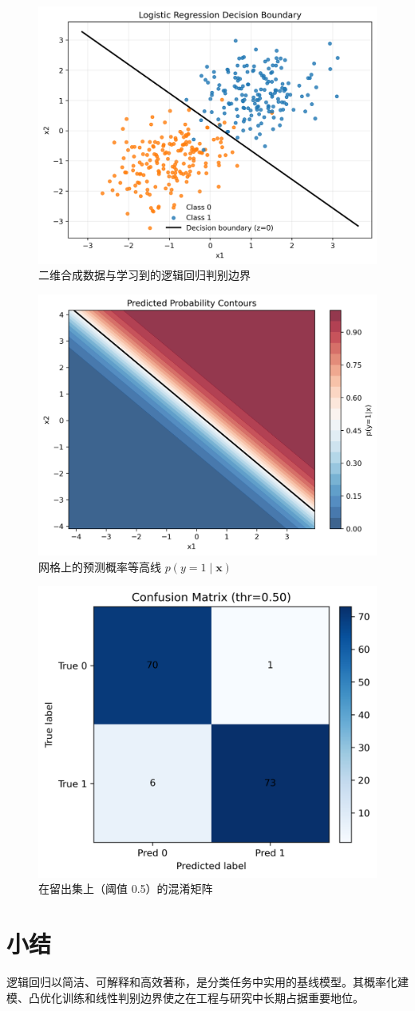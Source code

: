 \documentclass[UTF8,zihao=-4]{ctexart}
\begin{document}
\begin{figure}[H]
  \centering
  \includegraphics[width=0.78\linewidth]{decision_boundary.png}
  \caption{二维合成数据与学习到的逻辑回归判别边界}
  \label{fig:boundary}
\end{figure}

\begin{figure}[H]
  \centering
  \includegraphics[width=0.78\linewidth]{probability_contours.png}
  \caption{网格上的预测概率等高线 $p(y=1\mid \bm{x})$}
  \label{fig:contours}
\end{figure}

\begin{figure}[H]
  \centering
  \includegraphics[width=0.6\linewidth]{confusion_matrix.png}
  \caption{在留出集上（阈值 0.5）的混淆矩阵}
  \label{fig:confusion}
\end{figure}

\FloatBarrier

\section{小结}
逻辑回归以简洁、可解释和高效著称，是分类任务中实用的基线模型。其概率化建模、凸优化训练和线性判别边界使之在工程与研究中长期占据重要地位。
\end{document}
